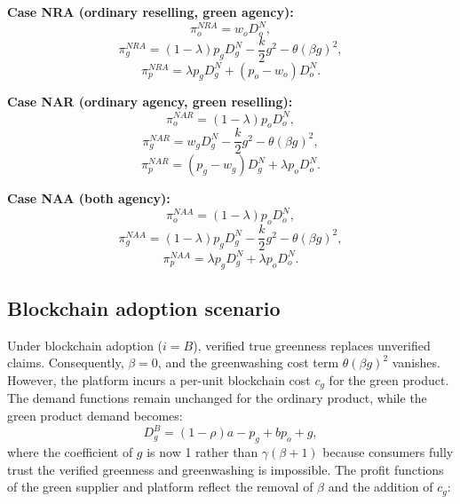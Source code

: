 \documentclass[preprint,review,12pt,authoryear,nopreprintline]{elsarticle}
\theoremstyle{definition}
\begin{document}
\noindent\textbf{Case NRA (ordinary reselling, green agency):}
\begin{equation}  \label{eq:profit-RA}
\pi_o^{NRA}=w_oD_o^N,
\end{equation}
\begin{equation}
\pi_g^{NRA}=(1-\lambda)p_g D_g^N-\frac{k}{2}g^2-\theta (\beta g)^2,
\end{equation}
\begin{equation}
\pi_p^{NRA}=\lambda p_gD_g^N+(p_o-w_o)D_o^N.
\end{equation}

\noindent\textbf{Case NAR (ordinary agency, green reselling):}
\begin{equation}  \label{eq:profit-AR}
\pi_o^{NAR}=(1-\lambda)p_oD_o^N,
\end{equation}
\begin{equation}
\pi_g^{NAR}=w_gD_g^N-\frac{k}{2}g^2-\theta (\beta g)^2,
\end{equation}
\begin{equation}
\pi_p^{NAR}=(p_g-w_g)D_g^N+\lambda p_oD_o^N.
\end{equation}

\noindent\textbf{Case NAA (both agency):}
\begin{equation}  \label{eq:profit-AA}
\pi_o^{NAA}=(1-\lambda)p_oD_o^N,
\end{equation}
\begin{equation}
\pi_g^{NAA}=(1-\lambda)p_gD_g^N-\frac{k}{2}g^2-\theta (\beta g)^2,
\end{equation}
\begin{equation}
\pi_p^{NAA}=\lambda p_gD_g^N+\lambda p_oD_o^N.
\end{equation}

\subsection{Blockchain adoption scenario}

Under blockchain adoption ($i = B$), verified true greenness replaces unverified claims. Consequently, $\beta = 0$, and the greenwashing cost term $\theta(\beta g)^2$ vanishes. However, the platform incurs a per-unit blockchain cost $c_g$ for the green product. The demand functions remain unchanged for the ordinary product, while the green product demand becomes:
\begin{equation}
D_g^{B}=(1-\rho)a-p_g+bp_o+g,
\end{equation}
where the coefficient of $g$ is now 1 rather than $\gamma(\beta+1)$ because consumers fully trust the verified greenness and greenwashing is impossible. The profit functions of the green supplier and platform reflect the removal of $\beta$ and the addition of $c_g$:
\end{document}
